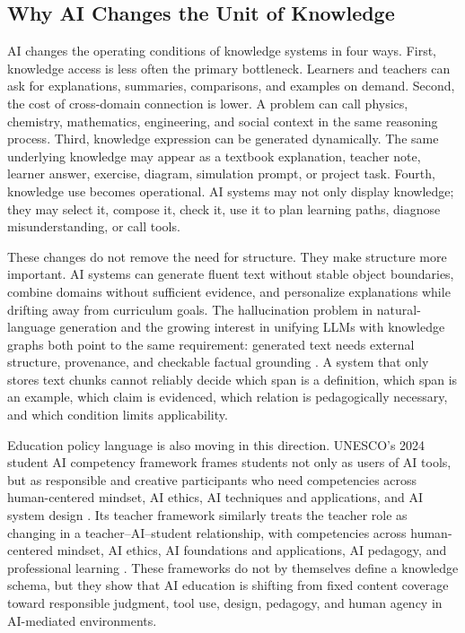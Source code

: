 \documentclass[11pt,letterpaper]{article}
\begin{document}
\subsection{Why AI Changes the Unit of Knowledge}

AI changes the operating conditions of knowledge systems in four ways. First, knowledge access is less often the primary bottleneck. Learners and teachers can ask for explanations, summaries, comparisons, and examples on demand. Second, the cost of cross-domain connection is lower. A problem can call physics, chemistry, mathematics, engineering, and social context in the same reasoning process. Third, knowledge expression can be generated dynamically. The same underlying knowledge may appear as a textbook explanation, teacher note, learner answer, exercise, diagram, simulation prompt, or project task. Fourth, knowledge use becomes operational. AI systems may not only display knowledge; they may select it, compose it, check it, use it to plan learning paths, diagnose misunderstanding, or call tools.

These changes do not remove the need for structure. They make structure more important. AI systems can generate fluent text without stable object boundaries, combine domains without sufficient evidence, and personalize explanations while drifting away from curriculum goals. The hallucination problem in natural-language generation and the growing interest in unifying LLMs with knowledge graphs both point to the same requirement: generated text needs external structure, provenance, and checkable factual grounding \cite{ji-hallucination,pan-llm-kg}. A system that only stores text chunks cannot reliably decide which span is a definition, which span is an example, which claim is evidenced, which relation is pedagogically necessary, and which condition limits applicability.

Education policy language is also moving in this direction. UNESCO's 2024 student AI competency framework frames students not only as users of AI tools, but as responsible and creative participants who need competencies across human-centered mindset, AI ethics, AI techniques and applications, and AI system design \cite{unesco-ai-students}. Its teacher framework similarly treats the teacher role as changing in a teacher--AI--student relationship, with competencies across human-centered mindset, AI ethics, AI foundations and applications, AI pedagogy, and professional learning \cite{unesco-ai-teachers}. These frameworks do not by themselves define a knowledge schema, but they show that AI education is shifting from fixed content coverage toward responsible judgment, tool use, design, pedagogy, and human agency in AI-mediated environments.
\end{document}
